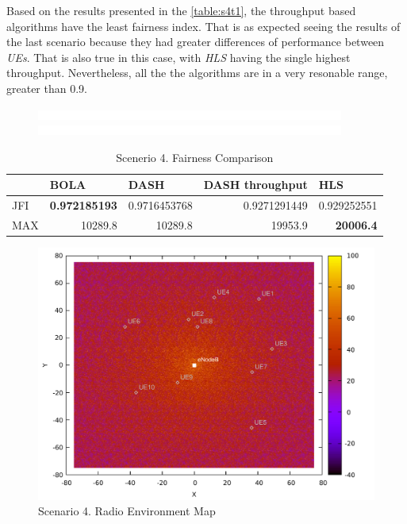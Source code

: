 Based on the results presented in the \autoref{table:s4t1}, the throughput based algorithms 
have the least fairness index. That is as expected seeing the results of the last scenario
because they had greater differences of performance between \textit{UEs}. That is also true in
this case, with \textit{HLS} having the single highest throughput. Nevertheless, all the
the algorithms are in a very resonable range, greater than 0.9.


\begin{figure}[h]
  \centering
  \includegraphics[width=0.9\textwidth]{img/space.png}
  \includegraphics[width=0.9\textwidth]{img/space.png}
\end{figure}


\begin{table}[h]
    \centering
    \begin{tabular}{@{}lrrrr@{}}
    \toprule
        & \multicolumn{1}{l}{BOLA} & \multicolumn{1}{l}{DASH} & \multicolumn{1}{l}{DASH throughput} & \multicolumn{1}{l}{HLS} \\ \midrule
    JFI & \textbf{0.972185193}     & 0.9716453768             & 0.9271291449                        & 0.929252551             \\
    MAX & 10289.8                  & 10289.8                  & 19953.9                             & \textbf{20006.4}        \\ \bottomrule
    \end{tabular}
    \caption{Scenerio 4. Fairness Comparison}
    \label{table:s4t1}
\end{table}


\begin{figure}[h]
  \centering
  \includegraphics[width=\textwidth]{img/s4i2.pdf}
  \caption{Scenario 4. Radio Environment Map}
  \label{fig:s4i2}
\end{figure}




